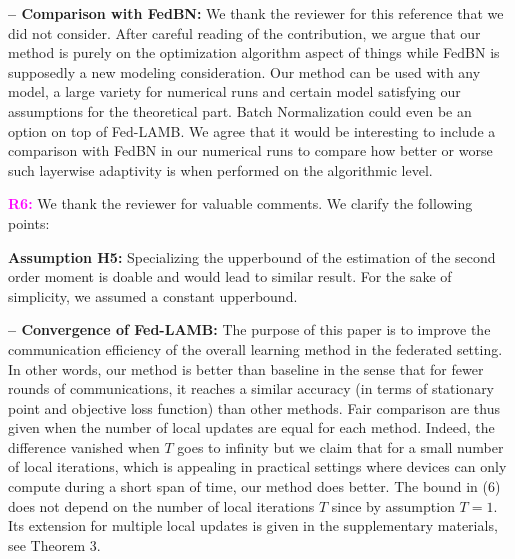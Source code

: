 \documentclass{article}
\begin{document}
\vspace{-2pt}
\textbf{-- Comparison with FedBN:} We thank the reviewer for this reference that we did not consider.
After careful reading of the contribution, we argue that our method is purely on the optimization algorithm aspect of things while FedBN is supposedly a new modeling consideration.
Our method can be used with any model, a large variety for numerical runs and certain model satisfying our assumptions for the theoretical part. 
Batch Normalization could even be an option on top of Fed-LAMB.
We agree that it would be interesting to include a comparison with FedBN in our numerical runs to compare how better or worse such layerwise adaptivity is when performed on the algorithmic level.

\textbf{\textcolor{magenta}{R6:}} We thank the reviewer for valuable comments. We clarify the following points: \vspace{-4pt}


\textbf{Assumption H5:} Specializing the upperbound of the estimation of the second order moment is doable and would lead to similar result. For the sake of simplicity, we assumed a constant upperbound.

\vspace{-2pt}
\textbf{-- Convergence of Fed-LAMB:} The purpose of this paper is to improve the communication efficiency of the overall learning method in the federated setting.
In other words, our method is better than baseline in the sense that for fewer rounds of communications, it reaches a similar accuracy (in terms of stationary point and objective loss function) than other methods.
Fair comparison are thus given when the number of local updates are equal for each method. 
Indeed, the difference vanished when $T$ goes to infinity but we claim that for a small number of local iterations, which is appealing in practical settings where devices can only compute during a short span of time, our method does better.
The bound in (6) does not depend on the number of local iterations $T$ since by assumption $T=1$.
Its extension for multiple local updates is given in the supplementary materials, see Theorem 3.

\end{document}
